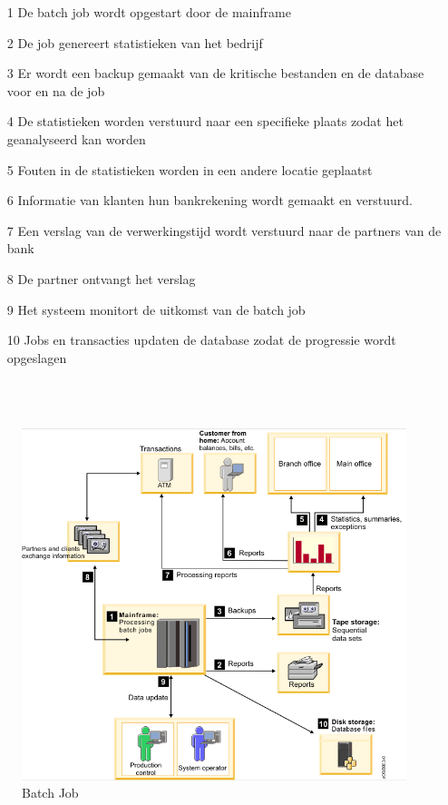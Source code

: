 \begin{itemize}
    \item[1] De batch job wordt opgestart door de mainframe
    \item[2] De job genereert statistieken van het bedrijf
    \item[3] Er wordt een backup gemaakt van de kritische bestanden en de database voor en na de job
    \item[4] De statistieken worden verstuurd naar een specifieke plaats zodat het geanalyseerd kan worden
    \item[5] Fouten in de statistieken worden in een andere locatie geplaatst
    \item[6] Informatie van klanten hun bankrekening wordt gemaakt en verstuurd.
    \item[7] Een verslag van de verwerkingstijd wordt verstuurd naar de partners van de bank
    \item[8] De partner ontvangt het verslag
    \item[9] Het systeem monitort de uitkomst van de batch job
    \item[10] Jobs en transacties updaten de database zodat de progressie wordt opgeslagen
\end{itemize}
\\ \\
\begin{figure}[p!]
    \centering
    \includegraphics[width=400pt]{./graphics/BatchJobVB.png}
    \caption{Batch Job \autocite{IBMb}}
    \label{fig:batch}
\end{figure}

